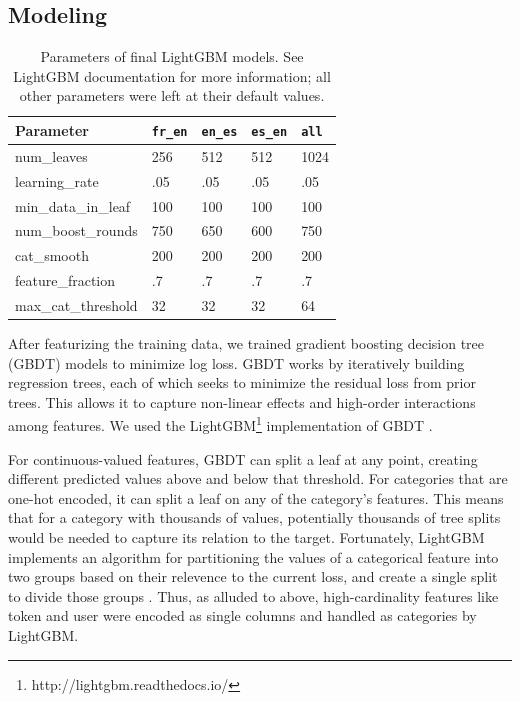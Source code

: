 \documentclass[11pt,a4paper]{article}
\begin{document}
\subsection{Modeling}

\begin{table}[t!]
\small
\begin{center}
\begin{tabular}{|l|llll|}
  \hline \bf Parameter & {\tt fr\_en} & {\tt en\_es} & {\tt es\_en} & {\tt all} \\ \hline
  num\_leaves & 256 & 512 & 512 & 1024 \\
  learning\_rate & .05 & .05 & .05 & .05 \\
  min\_data\_in\_leaf & 100 & 100 & 100 & 100 \\
  num\_boost\_rounds & 750 & 650 & 600 & 750 \\
  cat\_smooth & 200 & 200 & 200& 200 \\
  feature\_fraction & .7 & .7 & .7 & .7 \\
  max\_cat\_threshold & 32 & 32 & 32& 64 \\
\hline
\end{tabular}
\end{center}
\caption{\label{lightgbm-params} Parameters of final LightGBM models. See
  LightGBM documentation for more information; all other parameters were left at
their default values.}
\end{table}

After featurizing the training data, we trained gradient boosting decision
tree (GBDT) models to minimize log loss. GBDT works by
iteratively building regression trees, each of which seeks to minimize the
residual loss from prior trees. This allows it to capture non-linear effects
and high-order interactions among features. We used the LightGBM\footnote{http://lightgbm.readthedocs.io/} implementation
of GBDT \cite{ke2017lightgbm}.

For continuous-valued features, GBDT can split a leaf at any point, creating
different predicted values above and below that threshold. For categories that
are one-hot encoded, it can split a leaf on any of the category's features. This
means that for a category with thousands of values, potentially thousands of
tree splits would be needed to capture its relation to the target. Fortunately,
LightGBM implements an algorithm for partitioning the values of a categorical
feature into two groups based on their relevence to the current loss, and create
a single split to divide those groups \cite{fisher1958grouping}. Thus, as
alluded to above, high-cardinality features like token and user were encoded as
single columns and handled as categories by LightGBM.
\end{document}
